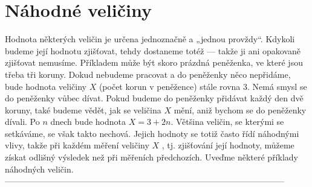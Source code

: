   \section{Náhodné veličiny}
    Hodnota některých veličin je určena jednoznačně a „jednou provždy“. Kdykoli budeme její hodnotu 
    zjišťovat, tehdy dostaneme totéž — takže ji ani opakovaně zjišťovat nemusíme. Příkladem může 
    být skoro prázdná peněženka, ve které jsou třeba tři koruny. Dokud nebudeme pracovat a do 
    peněženky něco nepřidáme, bude hodnota veličiny \(X\) (počet korun v peněžence) stále rovna 
    \num{3}. Nemá smysl se do peněženky vůbec dívat. Pokud budeme do peněženky přidávat každý den 
    dvě koruny, také budeme vědět, jak se veličina \(X\) mění, aniž bychom se do peněženky dívali. 
    Po \(n\) dnech bude hodnota \(X = 3 + 2n\). Většina veličin, se kterými se setkáváme, se však 
    takto nechová. Jejich hodnoty se totiž často řídí náhodnými vlivy, takže při každém
    měření veličiny \(X\) , tj. zjišťování její hodnoty, můžeme získat odlišný výsledek než při 
    měřeních předchozích. Uveďme některé příklady náhodných veličin.
---------------------------------------------------------------------------------------------------
\printbibliography[heading=subbibliography]
